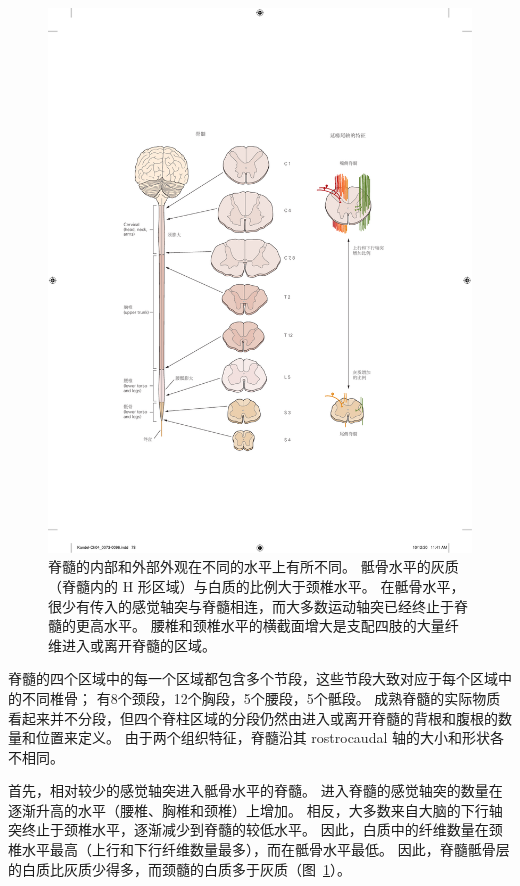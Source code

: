 \begin{figure}[htbp]
	\centering
	\includegraphics[width=1.0\linewidth]{chap04/fig_4_4}
	\caption{脊髓的内部和外部外观在不同的水平上有所不同。 
		骶骨水平的灰质（脊髓内的 H 形区域）与白质的比例大于颈椎水平。 
		在骶骨水平，很少有传入的感觉轴突与脊髓相连，而大多数运动轴突已经终止于脊髓的更高水平。 
		腰椎和颈椎水平的横截面增大是支配四肢的大量纤维进入或离开脊髓的区域。}
	\label{fig:4_4}
\end{figure}


脊髓的四个区域中的每一个区域都包含多个节段，这些节段大致对应于每个区域中的不同椎骨；
有8个颈段，12个胸段，5个腰段，5个骶段。
成熟脊髓的实际物质看起来并不分段，但四个脊柱区域的分段仍然由进入或离开脊髓的背根和腹根的数量和位置来定义。
由于两个组织特征，脊髓沿其 rostrocaudal 轴的大小和形状各不相同。


首先，相对较少的感觉轴突进入骶骨水平的脊髓。
进入脊髓的感觉轴突的数量在逐渐升高的水平（腰椎、胸椎和颈椎）上增加。
相反，大多数来自大脑的下行轴突终止于颈椎水平，逐渐减少到脊髓的较低水平。
因此，白质中的纤维数量在颈椎水平最高（上行和下行纤维数量最多），而在骶骨水平最低。
因此，脊髓骶骨层的白质比灰质少得多，而颈髓的白质多于灰质（图~\ref{fig:4_4}）。


